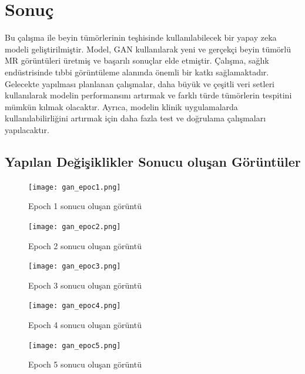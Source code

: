 \documentclass[10pt]{article}
\begin{document}
	
	
	
	\section{Sonuç}
	Bu çalışma ile beyin tümörlerinin teşhisinde kullanılabilecek bir yapay zeka modeli geliştirilmiştir. Model, GAN kullanılarak yeni ve gerçekçi beyin tümörlü MR görüntüleri üretmiş ve başarılı sonuçlar elde etmiştir. Çalışma, sağlık endüstrisinde tıbbi görüntüleme alanında önemli bir katkı sağlamaktadır. Gelecekte yapılması planlanan çalışmalar, daha büyük ve çeşitli veri setleri kullanılarak modelin performansını artırmak ve farklı türde tümörlerin tespitini mümkün kılmak olacaktır. Ayrıca, modelin klinik uygulamalarda kullanılabilirliğini artırmak için daha fazla test ve doğrulama çalışmaları yapılacaktır.
	
	
	
	\subsection{Yapılan Değişiklikler Sonucu oluşan Görüntüler}
	\begin{figure}[htbp]
		\centering
		\texttt{[image: gan\_epoc1.png]}
		\caption{Epoch 1 sonucu oluşan görüntü}
		\label{fig:uretici_tuketici}
	\end{figure}
	
	\begin{figure}[htbp]
		\centering
		\texttt{[image: gan\_epoc2.png]}
		\caption{Epoch 2 sonucu oluşan görüntü}
		\label{fig:uretici_tuketici}
	\end{figure}
	
	\begin{figure}[htbp]
		\centering
		\texttt{[image: gan\_epoc3.png]}
		\caption{Epoch 3 sonucu oluşan görüntü}
		\label{fig:uretici_tuketici}
	\end{figure}
	
	\begin{figure}[htbp]
		\centering
		\texttt{[image: gan\_epoc4.png]}
		\caption{Epoch 4 sonucu oluşan görüntü}
		\label{fig:uretici_tuketici}
	\end{figure}
	
	\begin{figure}[htbp]
		\centering
		\texttt{[image: gan\_epoc5.png]}
		\caption{Epoch 5 sonucu oluşan görüntü}
		\label{fig:uretici_tuketici}
	\end{figure}
	
	\clearpage %
	
\end{document}
